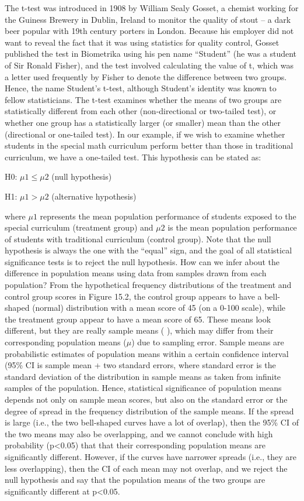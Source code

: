 The t-test was introduced in 1908 by William Sealy Gosset, a chemist working for the Guiness Brewery in Dublin, Ireland to monitor the quality of stout – a dark beer popular with 19th century porters in London. Because his employer did not want to reveal the fact that it was using statistics for quality control, Gosset published the test in Biometrika using his pen name “Student” (he was a student of Sir Ronald Fisher), and the test involved calculating the value of t, which was a letter used frequently by Fisher to denote the difference between two groups. Hence, the name Student’s t-test, although Student’s identity was known to fellow statisticians. The t-test examines whether the means of two groups are statistically different from each other (non-directional or two-tailed test), or whether one group has a statistically larger (or smaller) mean than the other (directional or one-tailed test). In our example, if we wish to examine whether students in the special math curriculum perform better than those in traditional curriculum, we have a one-tailed test. This hypothesis can be stated as:

H0: $ \mu1 \leq \mu2 $ (null hypothesis)

H1: $ \mu1 > \mu2 $ (alternative hypothesis)

where $ \mu1 $ represents the mean population performance of students exposed to the special curriculum (treatment group) and $ \mu2 $ is the mean population performance of students with traditional curriculum (control group). Note that the null hypothesis is always the one with the “equal” sign, and the goal of all statistical significance tests is to reject the null hypothesis. How can we infer about the difference in population means using data from samples drawn from each population? From the hypothetical frequency distributions of the treatment and control group scores in Figure 15.2, the control group appears to have a bell-shaped (normal) distribution with a mean score of 45 (on a 0-100 scale), while the treatment group appear to have a mean score of 65. These means look different, but they are really sample means ( ), which may differ from their corresponding population means ($ \mu $) due to sampling error. Sample means are probabilistic estimates of population means within a certain confidence interval (95\% CI is sample mean + two standard errors, where standard error is the standard deviation of the distribution in sample means as taken from infinite samples of the population. Hence, statistical significance of population means depends not only on sample mean scores, but also on the standard error or the degree of spread in the frequency distribution of the sample means. If the spread is large (i.e., the two bell-shaped curves have a lot of overlap), then the 95\% CI of the two means may also be overlapping, and we cannot conclude with high probability (p<0.05) that that their corresponding population means are significantly different. However, if the curves have narrower spreads (i.e., they are less overlapping), then the CI of each mean may not overlap, and we reject the null hypothesis and say that the population means of the two groups are significantly different at p<0.05.

